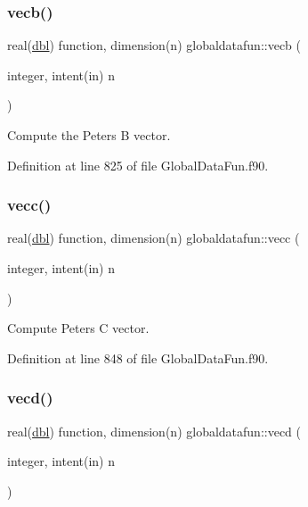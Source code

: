 \mbox{\label{namespaceglobaldatafun_a0ef3145b88a5e2f7679e5309ed885bc4}} 
\subsubsection{\texorpdfstring{vecb()}{vecb()}}
{\footnotesize\ttfamily real(\hyperlink{namespaceglobaldatafun_a5008801201dd34f2af8eae07756befb4}{dbl}) function, dimension(n) globaldatafun\+::vecb (\begin{DoxyParamCaption}\item[{integer, intent(in)}]{n }\end{DoxyParamCaption})\hspace{0.3cm}{\ttfamily [private]}}



Compute the Peters B vector. 



Definition at line 825 of file Global\+Data\+Fun.\+f90.

\mbox{\label{namespaceglobaldatafun_ac274536794b3306528c0130a20080b15}} 
\subsubsection{\texorpdfstring{vecc()}{vecc()}}
{\footnotesize\ttfamily real(\hyperlink{namespaceglobaldatafun_a5008801201dd34f2af8eae07756befb4}{dbl}) function, dimension(n) globaldatafun\+::vecc (\begin{DoxyParamCaption}\item[{integer, intent(in)}]{n }\end{DoxyParamCaption})\hspace{0.3cm}{\ttfamily [private]}}



Compute Peters C vector. 



Definition at line 848 of file Global\+Data\+Fun.\+f90.

\mbox{\label{namespaceglobaldatafun_a71653a1d825c3dee70490c228d23b738}} 
\subsubsection{\texorpdfstring{vecd()}{vecd()}}
{\footnotesize\ttfamily real(\hyperlink{namespaceglobaldatafun_a5008801201dd34f2af8eae07756befb4}{dbl}) function, dimension(n) globaldatafun\+::vecd (\begin{DoxyParamCaption}\item[{integer, intent(in)}]{n }\end{DoxyParamCaption})\hspace{0.3cm}{\ttfamily [private]}}



